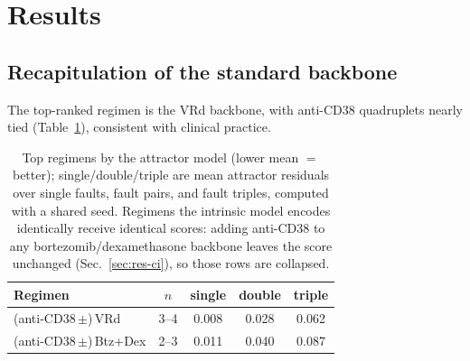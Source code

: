 \documentclass[conference,letterpaper]{IEEEtran}
\begin{document}
\section{Results}\label{sec:results}

\subsection{Recapitulation of the standard backbone}\label{sec:res-vrd}
The top-ranked regimen is the VRd backbone, with anti-CD38 quadruplets nearly
tied (Table~\ref{tab:rank}), consistent with clinical practice.

\begin{table}[t]
\centering\small
\caption{Top regimens by the attractor model (lower mean $=$ better);
single/double/triple are mean attractor residuals over single faults, fault pairs, and fault triples, computed with a shared seed.
Regimens the intrinsic model encodes identically receive identical scores: adding
anti-CD38 to any bortezomib/dexamethasone backbone leaves the score unchanged
(Sec.~\ref{sec:res-ci}), so those rows are collapsed.}
\label{tab:rank}
\begin{tabular}{@{}lcccc@{}}
\toprule
Regimen & $n$ & single & double & triple \\
\midrule
(anti-CD38\,$\pm$)\,VRd & 3--4 & 0.008 & 0.028 & 0.062 \\
(anti-CD38\,$\pm$)\,Btz+Dex & 2--3 & 0.011 & 0.040 & 0.087 \\
\bottomrule
\end{tabular}
\end{table}
\end{document}
